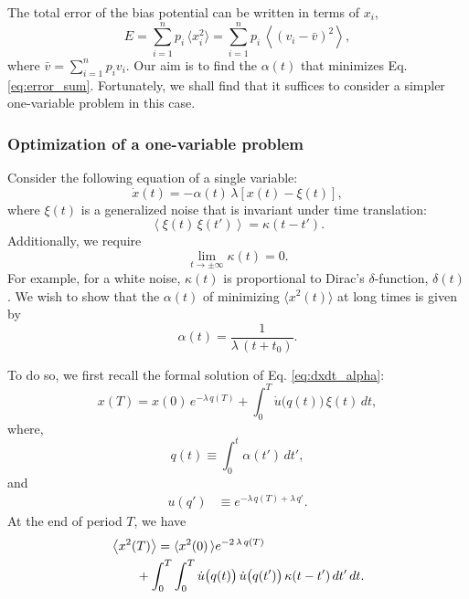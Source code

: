 \documentclass[reprint, floatfix]{revtex4-1}
\newcommand{\Err}{E}
\begin{document}
The total error of the bias potential can be written in
terms of $x_i$,
\begin{equation}
\Err
=
\sum_{i = 1}^n p_i \, \langle x_i^2 \rangle
=
\sum_{i = 1}^n p_i \, \left\langle (v_i - \bar v)^2 \right\rangle,
\label{eq:error_sum}
\end{equation}
where
$\bar v = \sum_{i = 1}^n p_i v_i$.
%
Our aim is to find the $\alpha(t)$
that minimizes Eq. \eqref{eq:error_sum}.
%
Fortunately, we shall find that it suffices to consider
a simpler one-variable problem
in this case.



\subsubsection{Optimization of a one-variable problem}



Consider the following equation
of a single variable:
%
\begin{equation}
\dot x(t) = -\alpha(t) \, \lambda \left[ x(t) - \xi(t) \right],
\label{eq:dxdt_alpha}
\end{equation}
%
where $\xi(t)$ is a generalized noise
that is invariant under time translation:
%
\begin{equation}
\left\langle \xi(t) \, \xi(t') \right\rangle
=
\kappa(t - t').
\label{eq:noise_correlation}
\end{equation}
%
Additionally, we require
\begin{equation}
  \lim_{t \rightarrow \pm\infty} \kappa(t) = 0.
  \label{eq:kappat_limit}
\end{equation}
%
For example, for a white noise,
$\kappa(t)$ is proportional to
Dirac's $\delta$-function, $\delta(t)$.
%
We wish to show that the $\alpha(t)$
of minimizing $\langle x^2(t) \rangle$ at long times
is given by
%
\begin{equation}
  \alpha(t) = \frac{1}{\lambda \, (t + t_0)}.
\label{eq:alpha_opt}
\end{equation}



To do so, we first recall
the formal solution of Eq. \eqref{eq:dxdt_alpha}:
%
\begin{equation}
x(T)
=
x(0) \, e^{-\lambda \, q(T)}
+
\int_0^T
  \dot u\bigl( q(t) \bigr) \, \xi(t) \, dt,
\label{eq:xt_solution}
\end{equation}
%
where,
%
\begin{equation}
q(t) \equiv \int_0^t \alpha(t') \, dt',
\label{eq:qt_definition}
\end{equation}
%
and
%
\begin{align}
u(q')
&\equiv
e^{-\lambda \, q(T) + \lambda \, q'}.
\label{eq:ut_definition}
\end{align}
At the end of period $T$, we have
\begin{align}
&\left\langle x^2(T) \right\rangle
=
\langle x^2(0) \,
\rangle e^{-2 \, \lambda \, q(T)}
\notag
\\
&\qquad
+
\int_0^T \int_0^T
  \dot u\bigl( q(t) \bigr) \,
  \dot u\bigl( q(t') \bigr) \,
  \kappa(t - t') \, dt' \, dt.
\label{eq:x2t_average}
\end{align}
\end{document}
